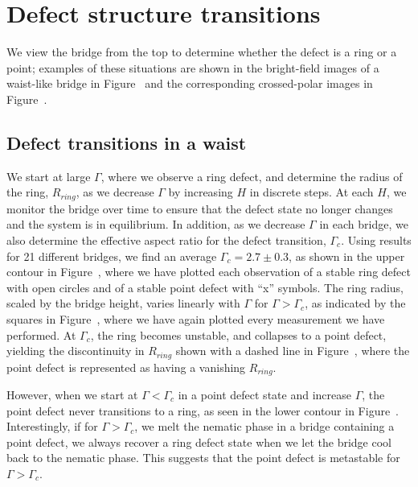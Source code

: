 \section{Defect structure transitions}
We view the bridge from the top to determine whether the defect is a ring or a point; examples of these situations are shown in the bright-field images of a waist-like bridge in Figure~ and the corresponding crossed-polar images in  Figure~.


\subsection{Defect transitions in a waist}
We start at large $\Gamma$, where we observe a ring defect, and determine the radius of the ring, $R_{ring}$, as we decrease $\Gamma$ by increasing $H$ in discrete steps.
At each $H$, we monitor the bridge over time to ensure that the defect state no longer changes and the system is in equilibrium.
In addition, as we decrease $\Gamma$ in each bridge, we also determine the effective aspect ratio for the defect transition, $\Gamma_c$.
Using results for 21 different bridges, we find an average $\Gamma_c = 2.7 \pm 0.3$, as shown in the upper contour in Figure~, where we have plotted each observation of a stable ring defect with open circles and of a stable point defect with ``x'' symbols.
The ring radius, scaled by the bridge height, varies linearly with $\Gamma$ for $\Gamma > \Gamma_c$, as indicated by the squares in Figure~, where we have again plotted every measurement we have performed.
At $\Gamma_c$, the  ring becomes unstable, and collapses to a point defect, yielding the discontinuity in $R_{ring}$ shown with a dashed line in Figure~, where the point defect is represented as having a vanishing $R_{ring}$.

However, when we start at $\Gamma < \Gamma_c$ in a point defect state and increase $\Gamma$, the point defect never transitions to a ring, as seen in the lower contour in Figure~.
Interestingly, if for $\Gamma > \Gamma_c$, we melt the nematic phase in a bridge containing a point defect, we always  recover a ring defect state when we let the bridge cool back to the nematic phase.
This suggests that the point defect is metastable for $\Gamma > \Gamma_c$.


